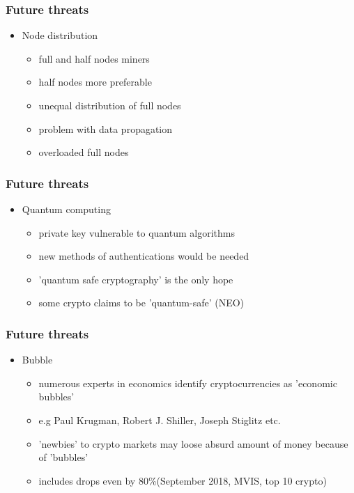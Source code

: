 \documentclass{beamer}
\begin{document}
\begin{frame}
\frametitle{Future threats}
    \begin{itemize}
        \item<1-> Node distribution
        \begin{itemize}
            \item<2-> full and half nodes miners
            \item<3-> half nodes more preferable
            \item<4-> unequal distribution of full nodes
            \item<5-> problem with data propagation
            \item<6-> overloaded full nodes
        \end{itemize}
    \end{itemize}
\end{frame}
\begin{frame}
\frametitle{Future threats}
    \begin{itemize}
        \item<1-> Quantum computing
        \begin{itemize}
            \item<2-> private key vulnerable to quantum algorithms
            \item<3-> new methods of authentications would be needed
            \item<4-> 'quantum safe cryptography' is the only hope 
            \item<5-> some crypto claims to be 'quantum-safe' (NEO)
        \end{itemize}
    \end{itemize}
\end{frame}
\begin{frame}
\frametitle{Future threats}
    \begin{itemize}
        \item<1-> Bubble
        \begin{itemize}
            \item<2-> numerous experts in economics identify cryptocurrencies as 'economic bubbles'
            \item<3-> e.g Paul Krugman, Robert J. Shiller, Joseph Stiglitz etc.
            \item<4-> 'newbies' to crypto markets may loose absurd amount of money because of 'bubbles'
            \item<5-> includes drops even by 80\%(September 2018, MVIS, top 10 crypto)
        \end{itemize}
    \end{itemize}
\end{frame}
\end{document}
